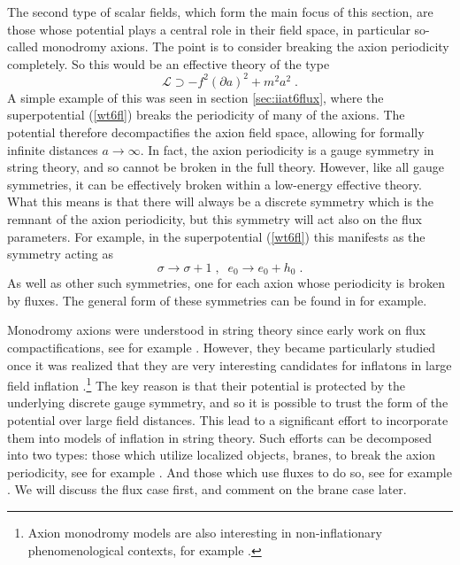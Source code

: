 \documentclass[11pt,a4paper]{article}
\numberwithin{equation}{section}
\numberwithin{table}{section}\setlength{\multlinegap}{25pt}
\newcommand{\cL}{\mathcal{L}}
\newcommand{\be}{\begin{equation}}
\newcommand{\ee}{\end{equation}}
\begin{document}
{The second type of scalar fields, which form the main focus of this section, are those whose potential plays a central role in their field space, in particular so-called monodromy axions. The point is to consider breaking the axion periodicity completely. So this would be an effective theory of the type
\be
\cL \supset - f^2 \left(\partial a \right)^2 + m^2 a^2 \;.
\label{effaxmonaty}
\ee
A simple example of this was seen in section \ref{sec:iiat6flux}, where the superpotential (\ref{wt6fl}) breaks the periodicity of many of the axions. The potential therefore decompactifies the axion field space, allowing for formally infinite distances $a \rightarrow \infty$. In fact, the axion periodicity is a gauge symmetry in string theory, and so cannot be broken in the full theory. However, like all gauge symmetries, it can be effectively broken within a low-energy effective theory. What this means is that there will always be a discrete symmetry which is the remnant of the axion periodicity, but this symmetry will act also on the flux parameters. For example, in the superpotential (\ref{wt6fl}) this manifests as the symmetry acting as
\be
\sigma \rightarrow \sigma + 1 \;,\;\; e_0 \rightarrow e_0 + h_0 \;.
\label{exaxperflux}
\ee
As well as other such symmetries, one for each axion whose periodicity is broken by fluxes. The general form of these symmetries can be found in \cite{DeWolfe:2005uu} for example.

Monodromy axions were understood in string theory since early work on flux compactifications, see for example \cite{Louis:2002ny}. However, they became particularly studied once it was realized that they are very interesting candidates for inflatons in large field inflation \cite{Silverstein:2008sg}.\footnote{Axion monodromy models are also interesting in non-inflationary phenomenological contexts, for example \cite{Graham:2015cka}.} The key reason is that their potential is protected by the underlying discrete gauge symmetry, and so it is possible to trust the form of the potential over large field distances. This lead to a significant effort to incorporate them into models of inflation in string theory. Such efforts can be decomposed into two types: those which utilize localized objects, branes, to break the axion periodicity, see for example \cite{McAllister:2008hb,Flauger:2009ab,Palti:2014kza,Escobar:2015ckf,Retolaza:2015sta}. And those which use fluxes to do so, see for example \cite{Marchesano:2014mla,Hebecker:2014eua,Arends:2014qca,Ibanez:2014kia,Blumenhagen:2014gta,Blumenhagen:2014nba,Franco:2014hsa,Ibanez:2014swa,Blumenhagen:2015qda,Buratti:2018xjt}. We will discuss the flux case first, and comment on the brane case later. 

}
\end{document}
